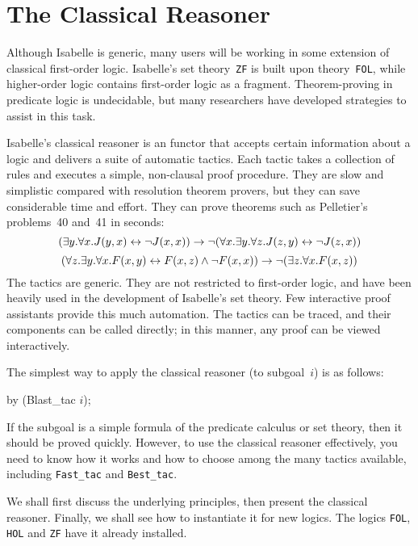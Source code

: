 \chapter{The Classical Reasoner}\label{chap:classical}
\newcommand\ainfer[2]{\begin{array}{r@{\,}l}#2\\ \hline#1\end{array}}

Although Isabelle is generic, many users will be working in some extension
of classical first-order logic.  Isabelle's set theory~{\tt ZF} is built
upon theory~{\tt FOL}, while higher-order logic contains first-order logic
as a fragment.  Theorem-proving in predicate logic is undecidable, but many
researchers have developed strategies to assist in this task.

Isabelle's classical reasoner is an \ML{} functor that accepts certain
information about a logic and delivers a suite of automatic tactics.  Each
tactic takes a collection of rules and executes a simple, non-clausal proof
procedure.  They are slow and simplistic compared with resolution theorem
provers, but they can save considerable time and effort.  They can prove
theorems such as Pelletier's~\cite{pelletier86} problems~40 and~41 in
seconds:
\[ (\exists y. \forall x. J(y,x) \leftrightarrow \neg J(x,x))  
   \rightarrow  \neg (\forall x. \exists y. \forall z. J(z,y) \leftrightarrow \neg J(z,x)) \]
\[ (\forall z. \exists y. \forall x. F(x,y) \leftrightarrow F(x,z) \wedge \neg F(x,x))
   \rightarrow \neg (\exists z. \forall x. F(x,z))  
\]
%
The tactics are generic.  They are not restricted to first-order logic, and
have been heavily used in the development of Isabelle's set theory.  Few
interactive proof assistants provide this much automation.  The tactics can
be traced, and their components can be called directly; in this manner,
any proof can be viewed interactively.

The simplest way to apply the classical reasoner (to subgoal~$i$) is as
follows:
\begin{ttbox}
by (Blast_tac \(i\));
\end{ttbox}
If the subgoal is a simple formula of the predicate calculus or set theory,
then it should be proved quickly.  However, to use the classical reasoner
effectively, you need to know how it works and how to choose among the many
tactics available, including {\tt Fast_tac} and {\tt Best_tac}.

We shall first discuss the underlying principles, then present the classical
reasoner.  Finally, we shall see how to instantiate it for new logics.  The
logics {\tt FOL}, {\tt HOL} and {\tt ZF} have it already installed.


